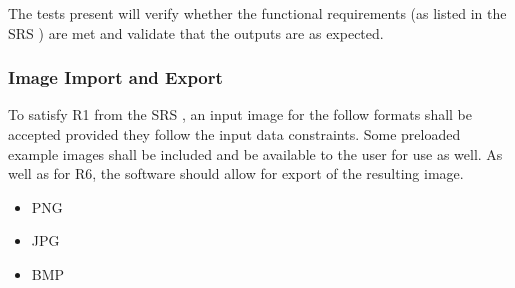 \documentclass[12pt, titlepage]{article}
\begin{document}
The tests present will verify whether the functional requirements 
(as listed in the SRS \cite{SRS}) are met and validate that the outputs
are as expected.

\subsubsection{Image Import and Export}

To satisfy R1 from the SRS \citep{SRS}, an input image for the follow formats shall be 
accepted provided they follow the input data constraints.
Some preloaded example images shall be included and be available to the user for use as well.
As well as for R6, the software should allow for export of the resulting image.

\begin{itemize}
  \item{PNG}
  \item{JPG}
  \item{BMP\\}
\end{itemize}
\end{document}

